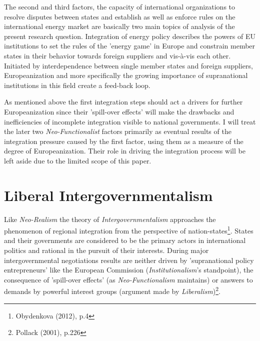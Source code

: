 \documentclass[11pt,a4paper,english]{scrreprt}
\begin{document}
The second and third factors, the capacity of international organizations to
resolve disputes between states and establish as well as enforce rules on the
international energy market are basically two main topics of analysis of the
present research question. Integration of energy policy describes the powers of
EU institutions to set the rules of the 'energy game' in Europe and constrain
member states in their behavior towards foreign suppliers and vis-\`{a}-vis each
other. Initiated by interdependence between single member states and foreign
suppliers, Europeanization and more specifically the growing importance of
supranational institutions in this field create a feed-back loop.\par

As mentioned above the first integration steps should act a drivers for further
Europeanization since their 'spill-over effects' will make the drawbacks and
inefficiencies of incomplete integration visible to national governments. I will
treat the later two \emph{Neo-Functionalist} factors primarily as eventual
results of the integration pressure caused by the first factor, using them as a
measure of the degree of Europeanization. Their role in driving the integration
process will be left aside due to the limited scope of this paper.\par
	
	


    \section{Liberal Intergovernmentalism}
	
	
Like \emph{Neo-Realism} the theory of \emph{Intergovernmentalism} approaches
the phenomenon of regional integration from the perspective of
nation-states\footnote{Obydenkova (2012), p.4}. States and their governments
are considered to be the primary actors in international politics and rational
in the pursuit of their interests. During major intergovernmental negotiations
results are neither driven by 'supranational policy entrepreneurs' like the
European Commission (\emph{Institutionalism}'s standpoint), the consequence of
'spill-over effects' (as \emph{Neo-Functionalism} maintains) or answers to
demands by powerful interest groups (argument made by
\emph{Liberalism})\footnote{Pollack (2001), p.226}.\par
\end{document}
